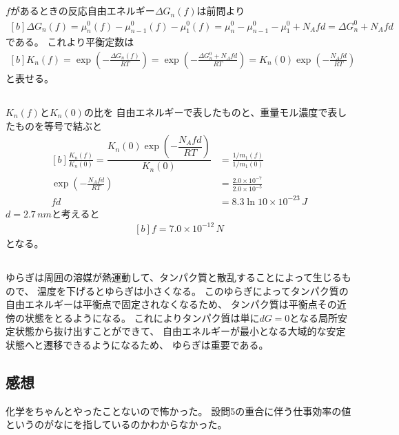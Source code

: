 \documentclass[../../master.tex]{subfiles}
\begin{document}
\subsection{}
\(f\)があるときの反応自由エネルギー\(\Delta G_n(f)\)は前問より
\begin{equation}\begin{aligned}[b]
    \Delta G_n(f) = \mu_{n}^0(f) -\mu_{n-1}^0(f) -\mu_1^0(f)
    = \mu_{n}^0 -\mu_{n-1}^0 -\mu_1^0 +N_Afd
    = \Delta G_n^0 + N_Afd
\end{aligned}\end{equation}
である。
これより平衡定数は
\begin{equation}\begin{aligned}[b]
    K_n(f) = \exp(-\frac{\Delta G_n(f)}{RT})
    = \exp(-\frac{\Delta G_n^0 + N_Afd}{RT})
    = K_n(0)\exp(-\frac{N_Afd}{RT})
\end{aligned}\end{equation}
と表せる。

\subsection{}
\(K_n(f)\)と\(K_n(0)\)の比を
自由エネルギーで表したものと、重量モル濃度で表したものを等号で結ぶと
\begin{equation}\begin{aligned}[b]
    \frac{K_n(f)}{K_n(0)} = \dfrac{K_n(0)\exp(-\dfrac{N_Afd}{RT})}{K_n(0)}
    &= \frac{1/m_1(f)}{1/m_1(0)}\\
    \exp(-\frac{N_Afd}{RT}) &= \frac{2.0\times 10^{-7}}{2.0\times 10^{-5}}\\
    fd &= 8.3\ln10 \times 10^{-23} \,\si{J}
\end{aligned}\end{equation}
\(d=2.7 \,\si{nm}\)と考えると
\begin{equation}\begin{aligned}[b]
    f = 7.0\times 10^{-12}\,\si{N}
\end{aligned}\end{equation}
となる。

\subsection{}
ゆらぎは周囲の溶媒が熱運動して、タンパク質と散乱することによって生じるもので、
温度を下げるとゆらぎは小さくなる。
このゆらぎによってタンパク質の自由エネルギーは平衡点で固定されなくなるため、
タンパク質は平衡点その近傍の状態をとるようになる。
これによりタンパク質は単に\(dG=0\)となる局所安定状態から抜け出すことができて、
自由エネルギーが最小となる大域的な安定状態へと遷移できるようになるため、
ゆらぎは重要である。

\subsection*{感想}
化学をちゃんとやったことないので怖かった。
設問5の重合に伴う仕事効率の値というのがなにを指しているのかわからなかった。
\end{document}
